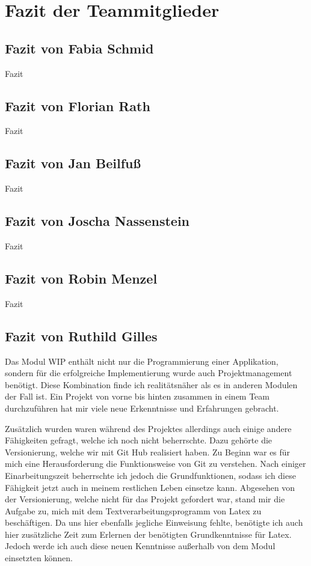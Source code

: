 \section{Fazit der Teammitglieder}
\label{instal}

\subsection{Fazit von Fabia Schmid}

Fazit

\subsection{Fazit von Florian Rath}

Fazit

\subsection{Fazit von Jan Beilfuß}

Fazit

\subsection{Fazit von Joscha Nassenstein}

Fazit

\subsection{Fazit von Robin Menzel}

Fazit

\subsection{Fazit von Ruthild Gilles}

Das Modul WIP enthält nicht nur die Programmierung einer Applikation, sondern für die erfolgreiche Implementierung wurde auch Projektmanagement benötigt. Diese Kombination finde ich realitätsnäher als es in anderen Modulen der Fall ist. Ein Projekt von vorne bis hinten zusammen in einem Team durchzuführen hat mir viele neue Erkenntnisse und Erfahrungen gebracht.

Zusätzlich wurden waren während des Projektes allerdings auch einige andere Fähigkeiten gefragt, welche ich noch nicht beherrschte. Dazu gehörte die Versionierung, welche wir mit Git Hub realisiert haben. Zu Beginn war es für mich eine Herausforderung die Funktionsweise von Git zu verstehen. Nach einiger Einarbeitungszeit beherrschte ich jedoch die Grundfunktionen, sodass ich diese Fähigkeit jetzt auch in meinem restlichen Leben einsetze kann. Abgesehen von der Versionierung, welche nicht für das Projekt gefordert war, stand mir die Aufgabe zu, mich mit dem Textverarbeitungsprogramm von Latex zu beschäftigen. Da uns hier ebenfalls jegliche Einweisung fehlte, benötigte ich auch hier zusätzliche Zeit zum Erlernen der benötigten Grundkenntnisse für Latex. Jedoch werde ich auch diese neuen Kenntnisse außerhalb von dem Modul einsetzten können.


